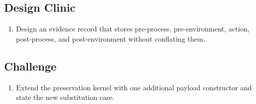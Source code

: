 \subsection*{Design Clinic}
\begin{enumerate}[label=\textbf{3.\arabic*},start=11]
\item Design an evidence record that stores pre-process, pre-environment, action, post-process, and post-environment without conflating them.
\end{enumerate}
\subsection*{Challenge}
\begin{enumerate}[label=\textbf{3.\arabic*},start=12]
\item Extend the preservation kernel with one additional payload constructor and state the new substitution case.
\end{enumerate}
